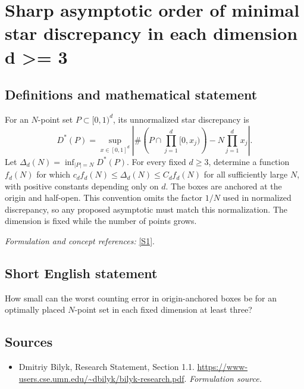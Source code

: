 \documentclass[11pt]{article}
\begin{document}
\section*{\texorpdfstring{Sharp asymptotic order of minimal star discrepancy in each dimension d >= 3}{Sharp asymptotic order of minimal star discrepancy in each dimension d >= 3}}\label{368}
\subsection{Definitions and mathematical statement}
For an $N$-point set $P\subset[0,1)^d$, its unnormalized star discrepancy is
\[
 D^*(P)=\sup_{x\in[0,1]^d}
 \left|\#\left(P\cap\prod_{j=1}^d[0,x_j)\right)-N\prod_{j=1}^dx_j\right|.
\]
Let $\Delta_d(N)=\inf_{|P|=N}D^*(P)$. For every fixed $d\ge3$, determine a function $f_d(N)$ for which $c_df_d(N)\le\Delta_d(N)\le C_df_d(N)$ for all sufficiently large $N$, with positive constants depending only on $d$. The boxes are anchored at the origin and half-open. This convention omits the factor $1/N$ used in normalized discrepancy, so any proposed asymptotic must match this normalization. The dimension is fixed while the number of points grows.
\par\smallskip\textit{Formulation and concept references:} \href{https://www-users.cse.umn.edu/~dbilyk/bilyk-research.pdf}{[S1]}.

\subsection{Short English statement}
How small can the worst counting error in origin-anchored boxes be for an optimally placed $N$-point set in each fixed dimension at least three?
\subsection{Sources}
\begin{itemize}
\item[S1]Dmitriy Bilyk, Research Statement, Section 1.1.
\url{https://www-users.cse.umn.edu/~dbilyk/bilyk-research.pdf}.
\textit{Formulation source.}
\end{itemize}
\end{document}

